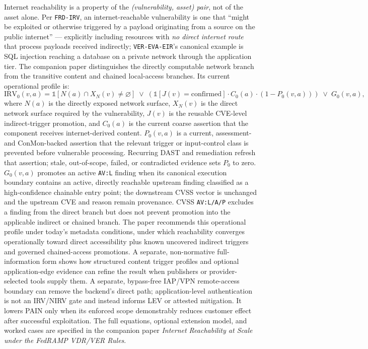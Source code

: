 \documentclass[11pt]{article}
\newcommand{\code}[1]{\texttt{#1}}
\newcommand{\ind}{\mathds{1}}
\begin{document}
\begin{definitionbox}
Internet reachability is a property of the \emph{(vulnerability, asset) pair}, not
of the asset alone. Per \code{FRD-IRV}, an internet-reachable vulnerability is one
that ``might be exploited or otherwise triggered by a payload originating from a
source on the public internet'' --- explicitly including resources with \emph{no
direct internet route} that process payloads received indirectly;
\code{VER-EVA-EIR}'s canonical example is SQL injection reaching a database on a
private network through the application tier. The companion paper distinguishes
the directly computable network branch from the transitive content and chained
local-access branches. Its current operational profile is:
\[
\mathrm{IRV}_0(v,a)=
\ind\!\left[N(a)\cap X_N(v)\neq\varnothing\right]
\;\lor\;
\left(\ind[J(v)=\mathrm{confirmed}]\cdot C_0(a)
\cdot\left(1-P_0(v,a)\right)\right)
\;\lor\;G_0(v,a),
\]
where $N(a)$ is the directly exposed network surface, $X_N(v)$ is the direct
network surface required by the vulnerability, $J(v)$ is the reusable CVE-level
indirect-trigger promotion, and $C_0(a)$ is the current coarse assertion that the
component receives internet-derived content. $P_0(v,a)$ is a current,
assessment- and ConMon-backed assertion that the relevant trigger or input-control
class is prevented before vulnerable processing. Recurring DAST and remediation
refresh that assertion; stale, out-of-scope, failed, or contradicted evidence sets
$P_0$ to zero. $G_0(v,a)$ promotes an active \code{AV:L} finding when its
canonical execution boundary contains an active, directly reachable upstream
finding classified as a high-confidence chainable entry point; the downstream
CVSS vector is unchanged and the upstream CVE and reason remain provenance.
CVSS \code{AV:L/A/P} excludes a finding from the direct branch but does not
prevent promotion into the applicable indirect or chained branch. The paper
recommends this operational profile under today's metadata conditions, under
which reachability converges operationally toward direct accessibility plus
known uncovered indirect triggers and governed chained-access promotions. A
separate, non-normative
full-information form shows how structured
content trigger profiles and optional application-edge evidence can refine the
result when publishers or provider-selected tools supply them. A separate,
bypass-free IAP/VPN remote-access boundary can remove the backend's direct path;
application-level authentication is not an IRV/NIRV gate and instead informs
LEV or attested mitigation. It lowers PAIN only when its enforced scope
demonstrably reduces customer effect after successful exploitation. The full
equations, optional extension model, and
worked cases are specified in the companion paper \emph{Internet Reachability at
Scale under the FedRAMP VDR/VER Rules}.
\end{definitionbox}
\end{document}
